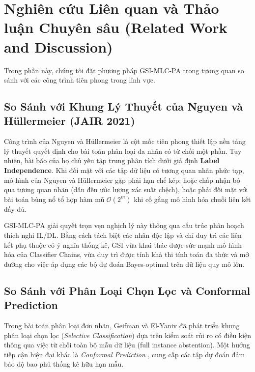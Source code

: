 \documentclass[11pt,a4paper]{article}
\begin{document}
\newpage
\section{Nghiên cứu Liên quan và Thảo luận Chuyên sâu (Related Work and Discussion)}
\label{sec:related_work}

Trong phần này, chúng tôi đặt phương pháp GSI-MLC-PA trong tương quan so sánh với các công trình tiên phong trong lĩnh vực.

\subsection{So Sánh với Khung Lý Thuyết của Nguyen và H\"ullermeier (JAIR 2021)}
Công trình của Nguyen và H\"ullermeier \cite{nguyen2021multilabel} là cột mốc tiên phong thiết lập nền tảng lý thuyết quyết định cho bài toán phân loại đa nhãn có từ chối một phần. Tuy nhiên, bài báo của họ chủ yếu tập trung phân tích dưới giả định \textbf{Label Independence}. Khi đối mặt với các tập dữ liệu có tương quan nhãn phức tạp, mô hình của Nguyen và H\"ullermeier gặp phải hạn chế kép: hoặc chấp nhận bỏ qua tương quan nhãn (dẫn đến ước lượng xác suất chệch), hoặc phải đối mặt với bài toán bùng nổ tổ hợp hàm mũ $\mathcal{O}(2^m)$ khi cố gắng mô hình hóa chuỗi liên kết đầy đủ.

GSI-MLC-PA giải quyết trọn vẹn nghịch lý này thông qua cấu trúc phân hoạch thích nghi IL/DL. Bằng cách tách biệt các nhãn độc lập và chỉ duy trì các liên kết phụ thuộc có ý nghĩa thống kê, GSI vừa khai thác được sức mạnh mô hình hóa của Classifier Chains, vừa duy trì được tính khả thi tính toán đa thức và mở đường cho việc áp dụng các bộ dự đoán Bayes-optimal trên dữ liệu quy mô lớn.

\subsection{So Sánh với Phân Loại Chọn Lọc và Conformal Prediction}
Trong bài toán phân loại đơn nhãn, Geifman và El-Yaniv \cite{geifman2017selective} đã phát triển khung phân loại chọn lọc (\textit{Selective Classification}) dựa trên kiểm soát rủi ro có điều kiện thông qua việc từ chối toàn bộ mẫu dữ liệu (full instance abstention). Một hướng tiếp cận hiện đại khác là \textit{Conformal Prediction} \cite{vovk2005algorithmic}, cung cấp các tập dự đoán đảm bảo độ bao phủ thống kê hữu hạn mẫu.
\end{document}
